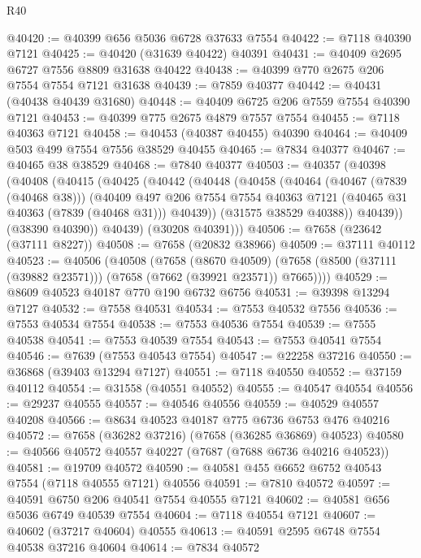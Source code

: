 \begin{lexlean}{R40}
\begin{coremodule}
@40420 := @40399 @656 @5036 @6728 @37633 @7554
@40422 := @7118 @40390 @7121
@40425 := @40420 (@31639 @40422) @40391
@40431 := @40409 @2695 @6727 @7556 @8809 @31638 @40422
@40438 := @40399 @770 @2675 @206 @7554 @7554 @7121 @31638
@40439 := @7859 @40377
@40442 := @40431 (@40438 @40439 @31680)
@40448 := @40409 @6725 @206 @7559 @7554 @40390 @7121
@40453 := @40399 @775 @2675 @4879 @7557 @7554
@40455 := @7118 @40363 @7121
@40458 := @40453 (@40387 @40455) @40390
@40464 := @40409 @503 @499 @7554 @7556 @38529 @40455
@40465 := @7834 @40377
@40467 := @40465 @38 @38529
@40468 := @7840 @40377
@40503 := @40357
    (@40398
      (@40408
        (@40415
          (@40425
            (@40442
              (@40448
                (@40458
                  (@40464
                    (@40467 (@7839 (@40468 @38)))
                    (@40409
                      @497
                      @206
                      @7554
                      @7554
                      @40363
                      @7121
                      (@40465 @31 @40363 (@7839 (@40468 @31)))
                      @40439))
                  (@31575 @38529 @40388))
                @40439))
            (@38390 @40390))
          @40439)
        (@30208 @40391)))
@40506 := @7658 (@23642 (@37111 @8227))
@40508 := @7658 (@20832 @38966)
@40509 := @37111 @40112
@40523 := @40506
    (@40508
      (@7658
        (@8670 @40509)
        (@7658 (@8500 (@37111 (@39882 @23571))) (@7658 (@7662 (@39921 @23571)) @7665))))
@40529 := @8609 @40523 @40187 @770 @190 @6732 @6756
@40531 := @39398 @13294 @7127
@40532 := @7558 @40531
@40534 := @7553 @40532 @7556
@40536 := @7553 @40534 @7554
@40538 := @7553 @40536 @7554
@40539 := @7555 @40538
@40541 := @7553 @40539 @7554
@40543 := @7553 @40541 @7554
@40546 := @7639 (@7553 @40543 @7554)
@40547 := @22258 @37216
@40550 := @36868 (@39403 @13294 @7127)
@40551 := @7118 @40550
@40552 := @37159 @40112
@40554 := @31558 (@40551 @40552)
@40555 := @40547 @40554
@40556 := @29237 @40555
@40557 := @40546 @40556
@40559 := @40529 @40557 @40208
@40566 := @8634 @40523 @40187 @775 @6736 @6753 @476 @40216
@40572 := @7658 (@36282 @37216) (@7658 (@36285 @36869) @40523)
@40580 := @40566 @40572 @40557 @40227 (@7687 (@7688 @6736 @40216 @40523))
@40581 := @19709 @40572
@40590 := @40581 @455 @6652 @6752 @40543 @7554 (@7118 @40555 @7121) @40556
@40591 := @7810 @40572
@40597 := @40591 @6750 @206 @40541 @7554 @40555 @7121
@40602 := @40581 @656 @5036 @6749 @40539 @7554
@40604 := @7118 @40554 @7121
@40607 := @40602 (@37217 @40604) @40555
@40613 := @40591 @2595 @6748 @7554 @40538 @37216 @40604
@40614 := @7834 @40572

\end{coremodule}
\end{lexlean}
